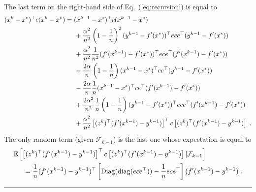 \documentclass{article}
\newcommand{\diag}{\mathop{\rm diag}}
\newcommand{\Diag}{\mathop{\rm Diag}}
\newcommand{\BlackBox}{\rule{1.5ex}{1.5ex}}  %
\newenvironment{proof}{\par\noindent{\bf Proof\ }}{\hfill\BlackBox\\[2mm]}
\newcommand{\eq}[1]{Eq.~(\ref{eq:#1})}
\def\diag{\operatorname{diag}}
\def\E{_{\scriptscriptstyle E}}
\def \E{{\mathbb E}}
\def \E{{\mathbb E}}
\begin{document}
\begin{proof}
The last term on the right-hand side of \eq{recursion} is equal to
\begin{align*}
(x^k - x^\ast)^\top c (x^k - x^\ast) &= (x^{k-1} - x^\ast)^\top c (x^{k-1} - x^\ast)\\
& \hspace*{.5cm} + \frac{\alpha^2}{n^2}\left(1 - \frac{1}{n}\right)^2 (y^{k-1} - f'(x^\ast))^\top e c e^\top (y^{k-1} - f'(x^\ast))\\
& \hspace*{.5cm} + \frac{\alpha^2}{n^2} \frac{1}{n^2} (f'(x^{k-1}) - f'(x^\ast))^\top e c e^\top (f'(x^{k-1}) - f'(x^\ast))\\
& \hspace*{.5cm} -\frac{2\alpha}{n}\left(1 - \frac{1}{n}\right) (x^{k-1} - x^\ast)^\top c e^\top (y^{k-1} - f'(x^\ast))\\
& \hspace*{.5cm} -\frac{2\alpha}{n}\frac{1}{n}(x^{k-1} - x^\ast)^\top c e^\top (f'(x^{k-1}) - f'(x^\ast))\\
& \hspace*{.5cm} + \frac{2\alpha^2}{n^2} \frac{1}{n}\left(1 - \frac{1}{n}\right)(y^{k-1} - f'(x^\ast))^\top e c e^\top (f'(x^{k-1}) - f'(x^\ast))\\
& \hspace*{.5cm} + \frac{\alpha^2}{n^2} \left[(z^k)^\top(f'(x^{k-1}) - y^{k-1})\right]^\top c \left[(z^k)^\top(f'(x^{k-1}) - y^{k-1})\right] \; .
\end{align*}
The only random term (given $\mathcal{F}_{k-1}$) is the last one whose expectation is equal to
\begin{align*}
&\E\left[ \left[(z^k)^\top(f'(x^{k-1}) - y^{k-1})\right]^\top c \left[(z^k)^\top(f'(x^{k-1}) - y^{k-1})\right]| \mathcal{F}_{k-1}\right]\\
&\hspace*{.5cm} = \frac{1}{n}(f'(x^{k-1}) - y^{k-1})^\top \left[\Diag(\diag(ece^\top)) - \frac{1}{n}ece^\top\right](f'(x^{k-1}) - y^{k-1}) \; .
\end{align*}


\end{proof}
\end{document}
